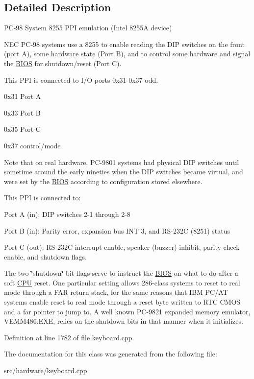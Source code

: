 \subsection{Detailed Description}
P\-C-\/98 System 8255 P\-P\-I emulation (Intel 8255\-A device) 

N\-E\-C P\-C-\/98 systems use a 8255 to enable reading the D\-I\-P switches on the front (port A), some hardware state (Port B), and to control some hardware and signal the \hyperlink{classBIOS}{B\-I\-O\-S} for shutdown/reset (Port C).

This P\-P\-I is connected to I/\-O ports 0x31-\/0x37 odd.
\begin{DoxyItemize}
\item 0x31 Port A
\item 0x33 Port B
\item 0x35 Port C
\item 0x37 control/mode
\end{DoxyItemize}

Note that on real hardware, P\-C-\/9801 systems had physical D\-I\-P switches until sometime around the early nineties when the D\-I\-P switches became virtual, and were set by the \hyperlink{classBIOS}{B\-I\-O\-S} according to configuration stored elsewhere.

This P\-P\-I is connected to\-:
\begin{DoxyItemize}
\item Port A (in)\-: D\-I\-P switches 2-\/1 through 2-\/8
\item Port B (in)\-: Parity error, expansion bus I\-N\-T 3, and R\-S-\/232\-C (8251) status
\item Port C (out)\-: R\-S-\/232\-C interrupt enable, speaker (buzzer) inhibit, parity check enable, and shutdown flags.
\end{DoxyItemize}

The two \char`\"{}shutdown\char`\"{} bit flags serve to instruct the \hyperlink{classBIOS}{B\-I\-O\-S} on what to do after a soft \hyperlink{classCPU}{C\-P\-U} reset. One particular setting allows 286-\/class systems to reset to real mode through a F\-A\-R return stack, for the same reasons that I\-B\-M P\-C/\-A\-T systems enable reset to real mode through a reset byte written to R\-T\-C C\-M\-O\-S and a far pointer to jump to. A well known P\-C-\/9821 expanded memory emulator, V\-E\-M\-M486.\-E\-X\-E, relies on the shutdown bits in that manner when it initializes. 

Definition at line 1782 of file keyboard.\-cpp.



The documentation for this class was generated from the following file\-:\begin{DoxyCompactItemize}
\item 
src/hardware/keyboard.\-cpp\end{DoxyCompactItemize}
